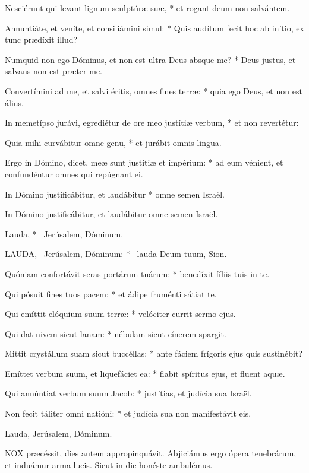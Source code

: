 Nesciérunt qui levant lignum sculptúræ suæ, * et rogant deum non salvántem.

Annuntiáte, et veníte, et consiliámini simul: * Quis audítum fecit hoc ab inítio, ex tunc prædíxit illud?

Numquid non ego Dóminus, et non est ultra Deus absque me? * Deus justus, et salvans non est præter me.

Convertímini ad me, et salvi éritis, omnes fines terræ: * quia ego Deus, et non est álius.

In memetípso jurávi, egrediétur de ore meo justítiæ verbum, * et non revertétur:

Quia mihi curvábitur omne genu, * et jurábit omnis lingua.

Ergo in Dómino, dicet, meæ sunt justítiæ et impérium: * ad eum vénient, et confundéntur omnes qui repúgnant ei.

In Dómino justificábitur, et laudábitur * omne semen Israël.

 In Dómino justificábitur, et laudábitur omne semen Israël.

 Lauda, * \textdagger\ Jerúsalem, Dóminum. \textdaggerdbl


\lettrine[lines=2]{L}{AUDA}, \textdagger\ Jerúsalem, Dóminum: * \textdaggerdbl\ lauda Deum tuum, Sion.

Quóniam confortávit seras portárum tuárum: * benedíxit fíliis tuis in te.

Qui pósuit fines tuos pacem: * et ádipe fruménti sátiat te.

Qui emíttit elóquium suum terræ: * velóciter currit sermo ejus.

Qui dat nivem sicut lanam: * nébulam sicut cínerem spargit.

Mittit crystállum suam sicut buccéllas: * ante fáciem frígoris ejus quis sustinébit?

Emíttet verbum suum, et liquefáciet ea: * flabit spíritus ejus, et fluent aquæ.

Qui annúntiat verbum suum Jacob: * justítias, et judícia sua Israël.

Non fecit táliter omni natióni: * et judícia sua non manifestávit eis.

 Lauda, Jerúsalem, Dóminum.



\lettrine[lines=2]{N}{OX} præcéssit, dies autem appropinquávit. Abjiciámus ergo ópera tenebrárum, et induámur arma lucis. Sicut in die honéste ambulémus.

